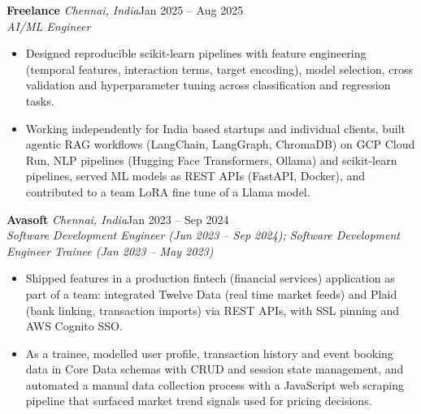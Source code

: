 \documentclass[a4paper,11pt]{article}
\newcommand{\role}[4]{%
  \textbf{#1}{\color{muted}\,\textperiodcentered\,\textit{#2}}\hfill{\color{muted}#3}\\
  \textit{#4}\par}
\newcommand{\gap}{\vspace{5pt}}
\begin{document}
\gap
{}
\role{Freelance}{Chennai, India}{Jan 2025 – Aug 2025}{AI/ML Engineer}
\begin{itemize}
  \item Designed reproducible scikit-learn pipelines with feature engineering (temporal features, interaction terms, target encoding), model selection, cross validation and hyperparameter tuning across classification and regression tasks.
  \item Working independently for India based startups and individual clients, built agentic RAG workflows (LangChain, LangGraph, ChromaDB) on GCP Cloud Run, NLP pipelines (Hugging Face Transformers, Ollama) and scikit-learn pipelines, served ML models as REST APIs (FastAPI, Docker), and contributed to a team LoRA fine tune of a Llama model.
\end{itemize}
\gap
{}
\role{Avasoft}{Chennai, India}{Jan 2023 – Sep 2024}{Software Development Engineer (Jun 2023 – Sep 2024); Software Development Engineer Trainee (Jan 2023 – May 2023)}
\begin{itemize}
  \item Shipped features in a production fintech (financial services) application as part of a team: integrated Twelve Data (real time market feeds) and Plaid (bank linking, transaction imports) via REST APIs, with SSL pinning and AWS Cognito SSO.
  \item As a trainee, modelled user profile, transaction history and event booking data in Core Data schemas with CRUD and session state management, and automated a manual data collection process with a JavaScript web scraping pipeline that surfaced market trend signals used for pricing decisions.
\end{itemize}
\end{document}
